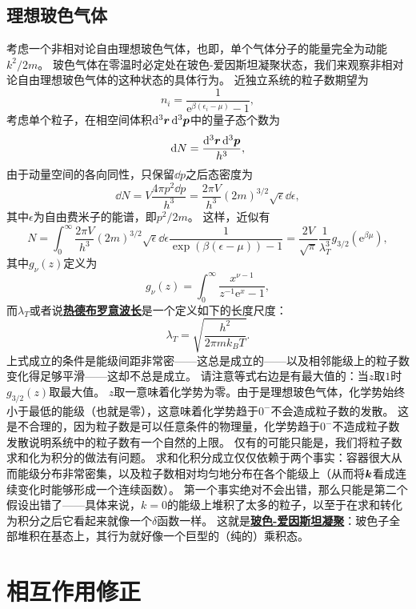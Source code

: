 \documentclass[hyperref, UTF8, a4paper]{ctexart}
\newcommand*{\ee}{\mathrm{e}}
\newcommand{\concept}[1]{\underline{\textbf{#1}}}
\begin{document}
\subsection{理想玻色气体}

考虑一个非相对论自由理想玻色气体，也即，单个气体分子的能量完全为动能$k^2/2m$。
玻色气体在零温时必定处在玻色-爱因斯坦凝聚状态，我们来观察非相对论自由理想玻色气体的这种状态的具体行为。
近独立系统的粒子数期望为
\[
    n_i = \frac{1}{\ee^{\beta(\epsilon_i - \mu)} - 1},
\]
考虑单个粒子，在相空间体积$\dd[3]{\vb*{r}} \dd[3]{\vb*{p}}$中的量子态个数为
\[
    \dd{N} = \frac{\dd[3]{\vb*{r}} \dd[3]{\vb*{p}}}{h^3},
\]
由于动量空间的各向同性，只保留$\dd{p}$之后态密度为
\[
    \dd{N} = V \frac{4\pi p^2 \dd{p}}{h^3} = \frac{2\pi V}{h^3} (2m)^{3/2} \sqrt{\epsilon} \dd{\epsilon},
\]
其中$\epsilon$为自由费米子的能谱，即$p^2/2m$。
这样，近似有
\begin{equation}
    N = \int_0^\infty \frac{2\pi V}{h^3} (2m)^{3/2} \sqrt{\epsilon} \dd{\epsilon} \frac{1}{\exp(\beta (\epsilon - \mu)) - 1} = \frac{2V}{\sqrt{\pi}} \frac{1}{\lambda_T^3} g_{3/2}(\ee^{\beta \mu}),
\end{equation}
其中$g_\nu(z)$定义为
\[
    g_\nu(z) = \int_0^\infty \frac{x^{\nu-1}}{z^{-1} \ee^{x} - 1},
\]
而$\lambda_T$或者说\concept{热德布罗意波长}是一个定义如下的长度尺度：
\begin{equation}
    \lambda_T = \sqrt{\frac{h^2}{2\pi m k_B T}}.
\end{equation}
上式成立的条件是能级间距非常密——这总是成立的——以及相邻能级上的粒子数变化得足够平滑——这却不总是成立。
请注意等式右边是有最大值的：当$z$取$1$时$g_{3/2}(z)$取最大值。
$z$取一意味着化学势为零。由于是理想玻色气体，化学势始终小于最低的能级（也就是零），这意味着化学势趋于$0^-$不会造成粒子数的发散。
这是不合理的，因为粒子数是可以任意条件的物理量，化学势趋于$0^-$不造成粒子数发散说明系统中的粒子数有一个自然的上限。
仅有的可能只能是，我们将粒子数求和化为积分的做法有问题。
求和化积分成立仅仅依赖于两个事实：容器很大从而能级分布非常密集，以及粒子数相对均匀地分布在各个能级上（从而将$\vb*{k}$看成连续变化时能够形成一个连续函数）。
第一个事实绝对不会出错，那么只能是第二个假设出错了——具体来说，$k=0$的能级上堆积了太多的粒子，以至于在求和转化为积分之后它看起来就像一个$\delta$函数一样。
这就是\concept{玻色-爱因斯坦凝聚}：玻色子全部堆积在基态上，其行为就好像一个巨型的（纯的）乘积态。

\section{相互作用修正}
\end{document}
